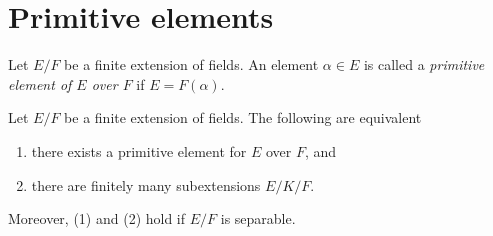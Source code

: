 \section{Primitive elements}
\label{section-primitive-element}

\noindent
Let $E/F$ be a finite extension of fields. An element $\alpha \in E$
is called a {\it primitive element of $E$ over $F$} if $E = F(\alpha)$.

\begin{lemma}
\label{lemma-primitive-element}
Let $E/F$ be a finite extension of fields. The following are equivalent
\begin{enumerate}
\item there exists a primitive element for $E$ over $F$, and
\item there are finitely many subextensions $E/K/F$.
\end{enumerate}
Moreover, (1) and (2) hold if $E/F$ is separable.
\end{lemma}

